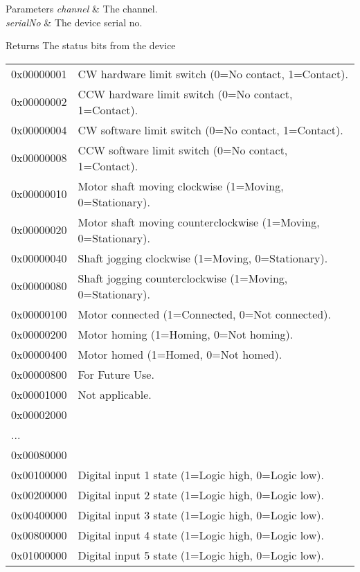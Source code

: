 \begin{DoxyParams}{Parameters}
{\em channel} & The channel. \\
\hline
{\em serial\+No} & The device serial no. \\
\hline
\end{DoxyParams}
\begin{DoxyReturn}{Returns}
The status bits from the device \tabulinesep=1mm
\begin{longtabu} spread 0pt [c]{*2{|X[-1]}|}
\hline
0x00000001&CW hardware limit switch (0=No contact, 1=Contact). \\
0x00000002&C\+CW hardware limit switch (0=No contact, 1=Contact). \\
0x00000004&CW software limit switch (0=No contact, 1=Contact). \\
0x00000008&C\+CW software limit switch (0=No contact, 1=Contact). \\
0x00000010&Motor shaft moving clockwise (1=Moving, 0=Stationary). \\
0x00000020&Motor shaft moving counterclockwise (1=Moving, 0=Stationary). \\
0x00000040&Shaft jogging clockwise (1=Moving, 0=Stationary). \\
0x00000080&Shaft jogging counterclockwise (1=Moving, 0=Stationary). \\
0x00000100&Motor connected (1=Connected, 0=Not connected). \\
0x00000200&Motor homing (1=Homing, 0=Not homing). \\
0x00000400&Motor homed (1=Homed, 0=Not homed). \\
0x00000800&For Future Use. \\
0x00001000&Not applicable. \\
0x00002000&\\
...&\\
0x00080000&\\
0x00100000&Digital input 1 state (1=Logic high, 0=Logic low). \\
0x00200000&Digital input 2 state (1=Logic high, 0=Logic low). \\
0x00400000&Digital input 3 state (1=Logic high, 0=Logic low). \\
0x00800000&Digital input 4 state (1=Logic high, 0=Logic low). \\
0x01000000&Digital input 5 state (1=Logic high, 0=Logic low). \\

\end{longtabu}
\end{DoxyReturn}
